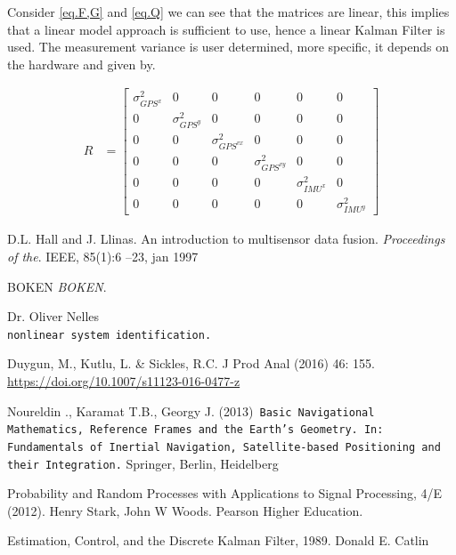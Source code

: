 Consider \eqref{eq.F,G} and \eqref{eq.Q} we can see that the matrices are linear, this implies that a linear model approach is sufficient to use, hence a linear Kalman Filter is used. The measurement variance is user determined, more specific, it depends on the hardware and given by.

\begin{align}
R&=
\begin{bmatrix}
\sigma^2_{GPS^{x}} & 0 & 0 & 0 & 0 & 0\\
0 & \sigma^2_{GPS^{y}} & 0 & 0 & 0 & 0\\
0 & 0 & \sigma^2_{GPS^{vx}} & 0 & 0 & 0\\
0 & 0 & 0 & \sigma^2_{GPS^{vy}} & 0 & 0\\
0 & 0 & 0 & 0 & \sigma^2_{{IMU}^{x}} & 0\\
0 & 0 & 0 & 0 & 0 & \sigma^2_{IMU^{y}}
\end{bmatrix}
\end{align}




\begin{thebibliography}{9}
D.L. Hall and J. Llinas. An introduction to multisensor data fusion. 
\textit{Proceedings of
the}. IEEE, 85(1):6 –23, jan 1997

 
BOKEN
\textit{BOKEN}. 

 
Dr. Oliver Nelles
\\\texttt{nonlinear system identification.}

Duygun, M., Kutlu, L. \& Sickles, R.C. J Prod Anal (2016) 46: 155. \url{https://doi.org/10.1007/s11123-016-0477-z}

Noureldin ., Karamat T.B., Georgy J. (2013)\texttt{ Basic Navigational Mathematics, Reference Frames and the Earth’s Geometry. In: Fundamentals of Inertial Navigation, Satellite-based Positioning and their Integration.} Springer, Berlin, Heidelberg

Probability and Random Processes with Applications to Signal Processing, 4/E (2012). 
Henry Stark, John W Woods. Pearson Higher Education. 

Estimation, Control, and the Discrete Kalman Filter, 1989. Donald E. Catlin

\end{thebibliography}





